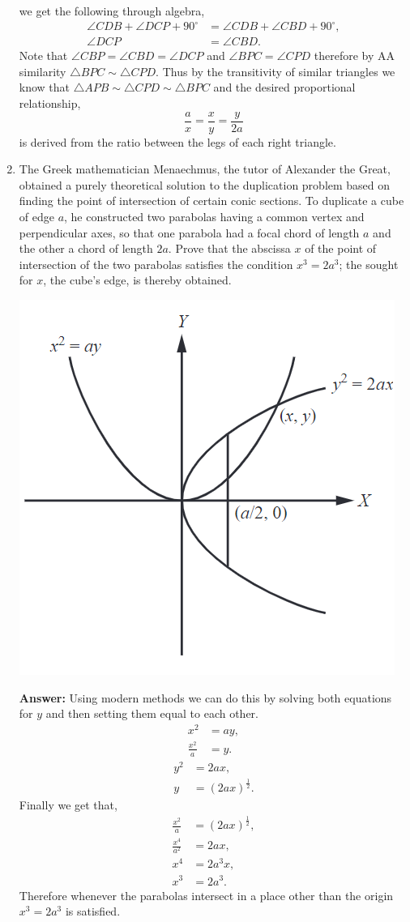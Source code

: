 \documentclass[12pt]{article}
\theoremstyle{homework}
\begin{document}
\begin{enumerate}
we get the following through algebra, 
\begin{align*}
  \angle CDB + \angle DCP + 90^{\circ} &= \angle CDB + \angle CBD + 90^{\circ},\\
  \angle DCP &= \angle CBD.
\end{align*}
Note that $\angle CBP = \angle CBD = \angle DCP$ and $\angle BPC =\angle CPD$ therefore by AA similarity $\triangle BPC \sim \triangle CPD$. Thus by 
the transitivity of similar triangles we know that $\triangle APB \sim \triangle CPD \sim \triangle BPC$ and the desired proportional relationship,
\begin{equation*}
  \frac{a}{x} = \frac{x}{y} = \frac{y}{2a}
\end{equation*}
is derived from the ratio between the legs of each right triangle. 
\vspace{.5in}



\setcounter{enumi}{3}
\item The Greek mathematician Menaechmus, the tutor of Alexander the Great, obtained a purely theoretical solution to the duplication problem
based on finding the point of intersection of certain conic sections. To duplicate a cube of edge $a$, he constructed two parabolas having a common vertex
and perpendicular axes, so that one parabola had a focal chord of length $a$ and the other a chord of length $2a$. Prove that the abscissa $x$ of the point of 
intersection of the two parabolas satisfies the condition $x^3 = 2a^3$; the sought for $x$, the cube's edge, is thereby obtained. 
\begin{center}
  \includegraphics[width = .33\textwidth]{conic.png}
\end{center}
\textbf{Answer:} Using modern methods we can do this by solving both equations for $y$ and then setting them equal to each other. 
\begin{align*}
  x^2 &= ay,\\
  \frac{x^2}{a} &= y.
\end{align*}
\begin{align*} 
  y^2 &= 2ax,\\
  y &= (2ax)^{\frac{1}{2}}.
\end{align*}
Finally we get that,
\begin{align*}
  \frac{x^2}{a} &= (2ax)^{\frac{1}{2}},\\
  \frac{x^4}{a^2} &= 2ax,\\
  x^4 &= 2a^3x,\\
  x^3 &= 2a^3.
\end{align*}
Therefore whenever the parabolas intersect in a place other than the origin $x^3 = 2a^3$ is satisfied.






\end{enumerate}
\end{document}
